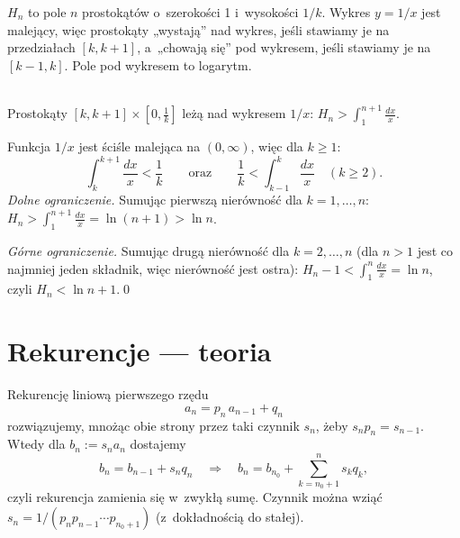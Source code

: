 \documentclass[11pt]{article}
\begin{document}
\begin{intuicja}
$H_n$ to pole $n$ prostokątów o~szerokości 1 i~wysokości $1/k$. Wykres
$y=1/x$ jest malejący, więc prostokąty „wystają” nad wykres, jeśli stawiamy je
na przedziałach $[k,k+1]$, a~„chowają się” pod wykresem, jeśli stawiamy je na
$[k-1,k]$. Pole pod wykresem to logarytm.
\end{intuicja}

\begin{center}
\\
{\small Prostokąty $[k,k+1]\times[0,\frac1k]$ leżą nad wykresem $1/x$: $H_n>\int_1^{n+1}\frac{dx}{x}$.}
\end{center}

\formalnie
Funkcja $1/x$ jest ściśle malejąca na $(0,\infty)$, więc dla $k\ge1$:
\[
\int_k^{k+1}\frac{dx}{x} < \frac1k \qquad\text{oraz}\qquad \frac1k<\int_{k-1}^{k}\frac{dx}{x}\quad(k\ge2).
\]
\emph{Dolne ograniczenie.} Sumując pierwszą nierówność dla $k=1,\dots,n$:
$H_n > \int_1^{n+1}\frac{dx}{x} = \ln(n+1) > \ln n$.

\emph{Górne ograniczenie.} Sumując drugą nierówność dla $k=2,\dots,n$ (dla $n>1$
jest co najmniej jeden składnik, więc nierówność jest ostra):
$H_n - 1 < \int_1^{n}\frac{dx}{x} = \ln n$, czyli $H_n<\ln n+1$.\qed

\section{Rekurencje --- teoria}

\begin{teoria}
Rekurencję liniową pierwszego rzędu
\[
a_n = p_n\, a_{n-1} + q_n
\]
rozwiązujemy, mnożąc obie strony przez taki czynnik $s_n$, żeby
$s_n p_n = s_{n-1}$. Wtedy dla $b_n := s_na_n$ dostajemy
\[
b_n = b_{n-1} + s_nq_n\quad\Longrightarrow\quad b_n = b_{n_0} + \sum_{k=n_0+1}^n s_kq_k,
\]
czyli rekurencja zamienia się w~zwykłą sumę. Czynnik można wziąć
$s_n = 1/(p_np_{n-1}\cdots p_{n_0+1})$ (z~dokładnością do stałej).
\end{teoria}
\end{document}
